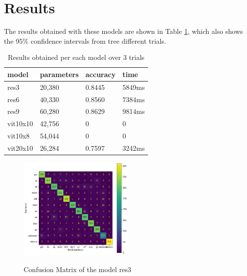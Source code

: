 
\section{Results}
\label{sec:results}



The results obtained with these models are shown in Table \ref{table:results}, which also shows the 95\% confidence intervals from tree  different trials.

\begin{table}
	\centering
	\begin{tabular}{|l|l|l|l|}
    \hline
    model  & parameters & accuracy  & time \\
    \hline
    res3 & 20,380 & 0.8445 & 5849ms \\
    \hline
    res6 & 40,330 & 0.8560 & 7384ms\\
    \hline
    res9 & 60,280 & 0.8629 & 9814ms \\
    \hline
    vit10x10 & 42,756 & 0 & 0  \\
    \hline
    vit10x8  & 54,044 & 0 & 0  \\
    \hline
    vit20x10  & 26,284 & 0.7597 & 3242ms \\
    \hline
    \end{tabular} 
\label{table:results}
\caption{Results obtained per each model over 3 trials}
\end{table}

\begin{figure}[h]
    \centering
    \includegraphics[width=0.5\textwidth]{confusion_matrix_res3_keyword.png}
    \label{fig:confusionmatrix}
    \caption{Confusion Matrix of the model res3}
\end{figure}


